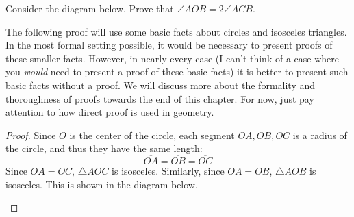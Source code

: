 \begin{theorem} 
Consider the diagram below. Prove that $\angle AOB = 2 \angle ACB$.
\end{theorem}

The following proof will use some basic facts about circles and isosceles triangles. In the most formal setting possible, it would be necessary to present proofs of these smaller facts. However, in nearly every case (I can't think of a case where you \emph{would} need to present a proof of these basic facts) it is better to present such basic facts without a proof. We will discuss more about the formality and thoroughness of proofs towards the end of this chapter. For now, just pay attention to how direct proof is used in geometry. 

\begin{proof}
Since $O$ is the center of the circle, each segment $OA, OB, OC$ is a radius of the circle, and thus they have the same length: 
\[
\overline{OA} = \overline{OB} = \overline{OC}
\]
Since $\overline{OA} = \overline{OC}$, $\triangle AOC$ is isosceles. Similarly, since $\overline{OA} = \overline{OB}$, $\triangle AOB$ is isosceles. This is shown in the diagram below. 

\begin{center}
\end{center}
\end{proof}
